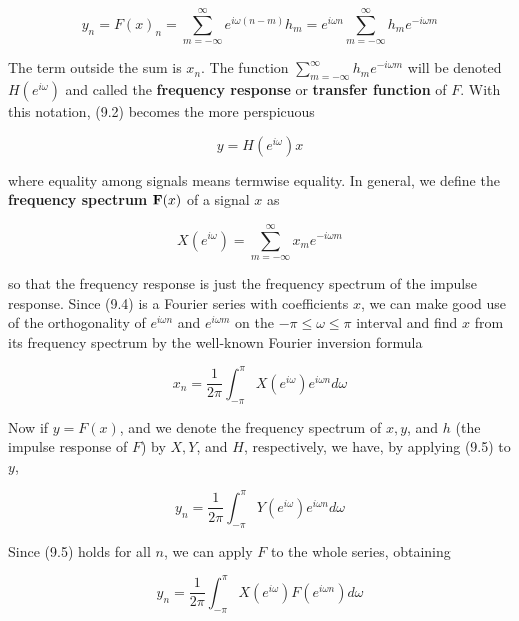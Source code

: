 \begin{equation}
y_n=F(x)_n = \sum_{m=-\infty}^{\infty} e^{i\omega (n-m)}h_m = e^{i\omega
  n}\sum_{m=-\infty}^{\infty} h_m e^{-i\omega m}
\end{equation}

\noindent
The term outside the sum is $x_n$. The function $\sum_{m=-\infty}^{\infty} h_m
e^{-i\omega m}$ will be denoted $H(e^{i\omega})$ and called the {\bf frequency
  response} or {\bf transfer
  function} of $F$. With this notation, (9.2) becomes
the more perspicuous

\begin{equation}
y=H(e^{i\omega})x
\end{equation}

\noindent
where equality among signals means termwise equality. In general, we define
the {\bf frequency spectrum} ${\bf F}(x)$ of a
signal $x$ as

\begin{equation}
X(e^{i\omega})=\sum_{m=-\infty}^{\infty}x_m e^{-i\omega m}
\end{equation}

\noindent
so that the frequency response is just the frequency spectrum of the impulse
response. Since (9.4) is a Fourier series with coefficients $x$, we can make 
good use of the orthogonality of $e^{i\omega n}$ and $e^{i\omega m}$ on the 
$-\pi \leq \omega \leq \pi$ interval and find $x$ from its frequency spectrum
by the well-known Fourier inversion formula

\begin{equation}
x_n=\frac{1}{2\pi}\int_{-\pi}^{\pi}X(e^{i\omega})e^{i\omega n}d\omega
\end{equation}

\noindent
Now if $y=F(x)$, and we denote the frequency spectrum of $x,y$, and $h$ (the
impulse response of $F$) by $X,Y$, and $H$, respectively, we have, by applying
(9.5) to $y$,

\begin{equation}
y_n=\frac{1}{2\pi}\int_{-\pi}^{\pi}Y(e^{i\omega})e^{i\omega n}d\omega
\end{equation}

\noindent
Since (9.5) holds for all $n$, we can apply $F$ to the whole series, 
obtaining 

\begin{equation}
y_n=\frac{1}{2\pi}\int_{-\pi}^{\pi}X(e^{i\omega})F(e^{i\omega n})d\omega
\end{equation}

